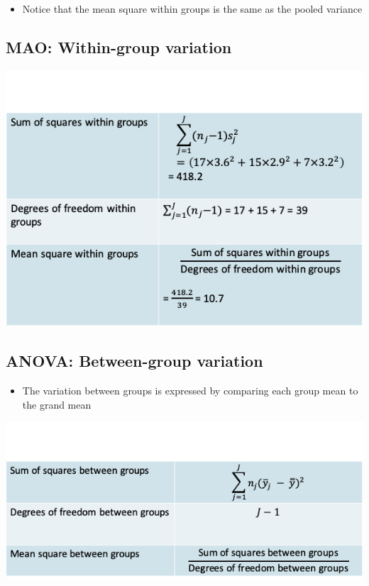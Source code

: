 \documentclass[
]{book}
\providecommand{\tightlist}{%
  \setlength{\itemsep}{0pt}\setlength{\parskip}{0pt}}
\begin{document}
\begin{itemize}
\tightlist
\item
  Notice that the mean square within groups is the same as the pooled variance
\end{itemize}

\hypertarget{mao-within-group-variation}{%
\subsection{MAO: Within-group variation}\label{mao-within-group-variation}}

\includegraphics[width=1\linewidth]{./10_24}

\hypertarget{anova-between-group-variation}{%
\subsection{ANOVA: Between-group variation}\label{anova-between-group-variation}}

\begin{itemize}
\tightlist
\item
  The variation between groups is expressed by comparing each group mean to the grand mean
\end{itemize}

\includegraphics[width=1\linewidth]{./10_25}
\end{document}
